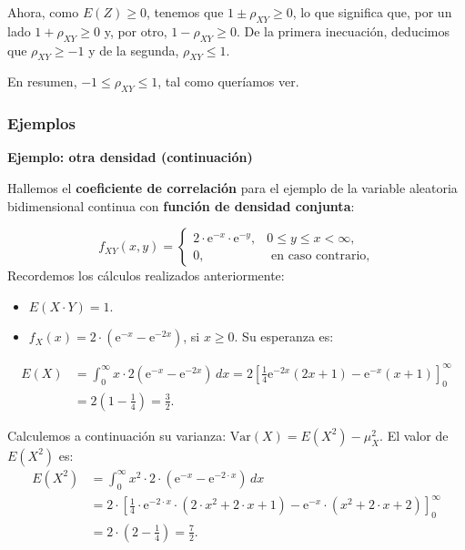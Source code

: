 \documentclass[]{book}
\begin{document}
Ahora, como \(E(Z)\geq 0\), tenemos que \(1\pm \rho_{XY}\geq 0\), lo que significa que, por un lado \(1+\rho_{XY}\geq 0\) y, por otro, \(1-\rho_{XY}\geq 0\). De la primera inecuación, deducimos que \(\rho_{XY}\geq -1\) y de la segunda, \(\rho_{XY}\leq 1\).

En resumen, \(-1\leq\rho_{XY}\leq 1\), tal como queríamos ver.

\hypertarget{ejemplos-5}{%
\subsubsection{Ejemplos}\label{ejemplos-5}}

\textbf{Ejemplo: otra densidad (continuación)}

Hallemos el \textbf{coeficiente de correlación} para el ejemplo de la variable aleatoria bidimensional continua con \textbf{función de densidad conjunta}:

\[
f_{XY}(x,y)=\begin{cases}
2\cdot  \mathrm{e}^{-x}\cdot \mathrm{e}^{-y}, & 0\leq y\leq x < \infty,\\
0, & \mbox{ en caso contrario,}
\end{cases}
\]
Recordemos los cálculos realizados anteriormente:

\begin{itemize}
\item
  \(E(X\cdot Y)=1.\)
\item
  \(f_X(x)=2\cdot \left(\mathrm{e}^{-x}-\mathrm{e}^{-2x}\right)\), si \(x\geq 0\). Su esperanza es:
\end{itemize}

\[
\begin{array}{rl}
E(X)&=\int_0^\infty x\cdot 2\left(\mathrm{e}^{-x}-\mathrm{e}^{-2x}\right)\, dx=2 \left[\frac{1}{4} \mathrm{e}^{-2 x} (2 x+1)-\mathrm{e}^{-x}(x+1)\right]_0^\infty \\
& = 2\left(1-\frac{1}{4}\right)=\frac{3}{2}.
\end{array}
\]

Calculemos a continuación su varianza: \(\mathrm{Var}(X)=E\left(X^2\right)-\mu_X^2\). El valor de \(E\left(X^2\right)\) es:
\[
\begin{array}{rl}
E\left(X^2\right) & =\displaystyle \int_0^\infty x^2 \cdot 2\cdot \left(\mathrm{e}^{-x}-\mathrm{e}^{-2\cdot x}\right)\, dx\\
&=\displaystyle 2 \cdot  \left[\frac{1}{4} \cdot \mathrm{e}^{-2 \cdot x} \cdot  (2\cdot x^2+2\cdot x+1)- \mathrm{e}^{-x} \cdot (x^2+2\cdot x+2)\right]_0^\infty \\ & = 2\cdot \left(2-\frac{1}{4}\right)=\frac{7}{2}.
\end{array}
\]
\end{document}
